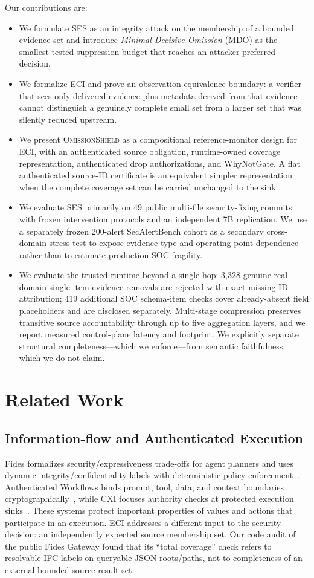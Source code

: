 \documentclass[journal,compsoc]{IEEEtran}
\newcommand{\system}{\textsc{OmissionShield}}
\begin{document}
Our contributions are:
\begin{itemize}
  \item We formulate SES as an integrity attack on the membership of a bounded evidence set and introduce \emph{Minimal Decisive Omission} (MDO) as the smallest tested suppression budget that reaches an attacker-preferred decision.
  \item We formalize ECI and prove an observation-equivalence boundary: a verifier that sees only delivered evidence plus metadata derived from that evidence cannot distinguish a genuinely complete small set from a larger set that was silently reduced upstream.
  \item We present \system{} as a compositional reference-monitor design for ECI, with an authenticated source obligation, runtime-owned coverage representation, authenticated drop authorizations, and WhyNotGate. A flat authenticated source-ID certificate is an equivalent simpler representation when the complete coverage set can be carried unchanged to the sink.
  \item We evaluate SES primarily on 49 public multi-file security-fixing commits with frozen intervention protocols and an independent 7B replication. We use a separately frozen 200-alert SecAlertBench cohort as a secondary cross-domain stress test to expose evidence-type and operating-point dependence rather than to estimate production SOC fragility.
  \item We evaluate the trusted runtime beyond a single hop: 3,328 genuine real-domain single-item evidence removals are rejected with exact missing-ID attribution; 419 additional SOC schema-item checks cover already-absent field placeholders and are disclosed separately. Multi-stage compression preserves transitive source accountability through up to five aggregation layers, and we report measured control-plane latency and footprint. We explicitly separate structural completeness---which we enforce---from semantic faithfulness, which we do not claim.
\end{itemize}

\section{Related Work}
\subsection{Information-flow and Authenticated Execution}
Fides formalizes security/expressiveness trade-offs for agent planners and uses dynamic integrity/confidentiality labels with deterministic policy enforcement~\cite{costa2025fides}. Authenticated Workflows binds prompt, tool, data, and context boundaries cryptographically~\cite{rajagopalan2026authenticated}, while CXI focuses authority checks at protected execution sinks~\cite{santos2026cxi}. These systems protect important properties of values and actions that participate in an execution. ECI addresses a different input to the security decision: an independently expected source membership set. Our code audit of the public Fides Gateway found that its ``total coverage'' check refers to resolvable IFC labels on queryable JSON roots/paths, not to completeness of an external bounded source result set.
\end{document}
